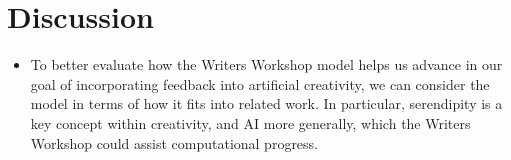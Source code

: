 \section{Discussion}

\begin{itemize} 
\item To better evaluate how the Writers Workshop model helps us
  advance in our goal of incorporating feedback into artificial
  creativity, we can consider the model in terms of how it fits into
  related work. In particular, serendipity is a key concept within
  creativity, and AI more generally, which the Writers Workshop could
  assist computational progress.
\end{itemize}
